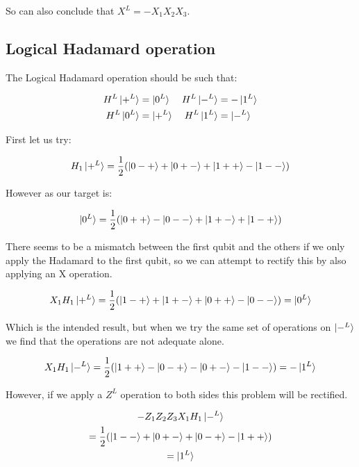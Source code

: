So can also conclude that $X^{L} = -X_{1}X_{2}X_{3}$.


\subsection{Logical Hadamard operation}

The Logical Hadamard operation should be such that:

\begin{align*}
H^{L} \ket{+^{L}} &= \ket{0^{L}} & H^{L} \ket{-^{L}} &= -\ket{1^{L}} \\
H^{L} \ket{0^{L}} &= \ket{+^{L}} & H^{L} \ket{1^{L}} &= \ket{-^{L}} \\
\end{align*}

First let us try:

\begin{equation}
H_{1} \ket{+^{L}} = \frac{1}{2}(\ket{0-+} +\ket{0+-} + \ket{1++} - \ket{1--})
\end{equation}

However as our target is:

\begin{equation*}
\ket{0^{L}} = \frac{1}{2} (\ket{0++} - \ket{0--} + \ket{1+-} + \ket{1-+})
\end{equation*}

There seems to be a mismatch between the first qubit and the others if we only apply the Hadamard to the first qubit, so we can attempt to rectify this by also applying an X operation.

\begin{equation}
X_{1} H_{1} \ket{+^{L}} = \frac{1}{2}(\ket{1-+} +\ket{1+-} + \ket{0++} - \ket{0--}) = \ket{0^{L}}
\end{equation}

Which is the intended result, but when we try the same set of operations on $\ket{-^{L}}$ we find that the operations are not adequate alone.

\begin{equation}
X_{1} H_{1} \ket{-^{L}} = \frac{1}{2}(\ket{1++} - \ket{0-+} - \ket{0+-} - \ket{1--}) = - \ket{1^{L}}
\end{equation}

However, if we apply a $Z^{L}$ operation to both sides this problem will be rectified.

\begin{multline}
- Z_{1} Z_{2} Z_{3} X_{1} H_{1} \ket{-^{L}} \\
= \frac{1}{2}(\ket{1--} + \ket{0+-} + \ket{0-+} - \ket{1++}) \\
= \ket{1^{L}} \\
\end{multline}

